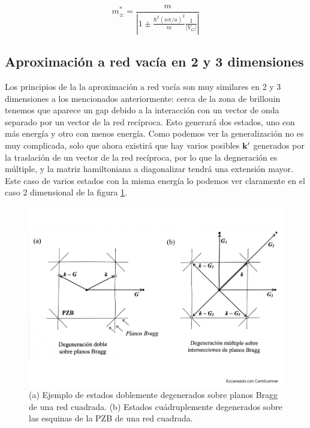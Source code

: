 \begin{equation}
	m_{\pm}^* = \frac{m}{\left|1 \pm \frac{\hbar^2 (n\pi/a)^2}{m} \frac{1}{|V_G|} \right| }
\end{equation}


\subsection{Aproximación a red vacía en 2 y 3 dimensiones}

Los principios de la la aproximación a red vacía son muy similares en 2 y 3 dimensiones a los mencionados anteriormente: cerca de la zona de brillouin tenemos que aparece un gap debido a la interacción con un vector de onda separado por un vector  de la red recíproca. Esto generará dos estados, uno con más energía y otro con menos energía. Como podemos ver la generalización no es muy complicada, solo que ahora existirá que hay varios posibles $\mathbf{k}'$ generados por la traslación de un vector de la red recíproca, por lo que la degneración es múltiple, y la matriz hamiltoniana a diagonalizar tendrá una extensión mayor. Este caso de varios estados con la misma energía lo podemos ver claramente en el caso 2 dimensional de la figura \ref{Fig:07-04}.

\begin{figure}[h!] \centering
	\includegraphics[scale=0.35]{Cuerpo/Ch_07/Fotos libro 2.pdf}
	\caption{(a) Ejemplo de estados doblemente degenerados sobre planos Bragg de una red cuadrada. (b) Estados cuádruplemente degenerados sobre las esquinas de la PZB de una red cuadrada.}
	\label{Fig:07-04}
\end{figure}    

